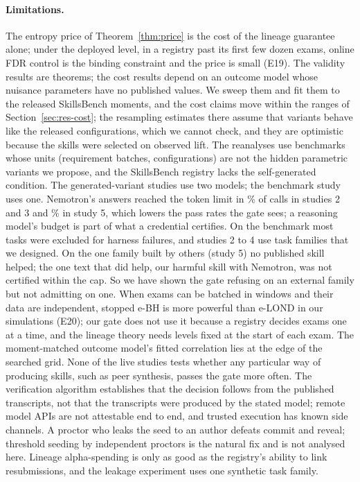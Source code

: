 \paragraph{Limitations.} The entropy price of Theorem~\ref{thm:price} is the cost of the lineage guarantee alone; under the deployed level, in a registry past its first few dozen exams, online FDR control is the binding constraint and the price is small (E19). The validity results are theorems; the cost results depend on an outcome model whose nuisance parameters have no published values. We sweep them and fit them to the released SkillsBench moments, and the cost claims move within the ranges of Section~\ref{sec:res-cost}; the resampling estimates there assume that variants behave like the released configurations, which we cannot check, and they are optimistic because the skills were selected on observed lift. The reanalyses use benchmarks whose units (requirement batches, configurations) are not the hidden parametric variants we propose, and the SkillsBench registry lacks the self-generated condition. The generated-variant studies use two models; the benchmark study uses one. Nemotron's answers reached the token limit in \NLnCutPct\% of calls in studies 2 and 3 and \NLnFiveCutPct\% in study 5, which lowers the pass rates the gate sees; a reasoning model's budget is part of what a credential certifies. On the benchmark most tasks were excluded for harness failures, and studies 2 to 4 use task families that we designed. On the one family built by others (study 5) no published skill helped; the one text that did help, our harmful skill with Nemotron, was not certified within the cap. So we have shown the gate refusing on an external family but not admitting on one. When exams can be batched in windows and their data are independent, stopped e-BH \citep{wang2025stopped} is more powerful than e-LOND in our simulations (E20); our gate does not use it because a registry decides exams one at a time, and the lineage theory needs levels fixed at the start of each exam. The moment-matched outcome model's fitted correlation lies at the edge of the searched grid. None of the live studies tests whether any particular way of producing skills, such as peer synthesis, passes the gate more often. The verification algorithm establishes that the decision follows from the published transcripts, not that the transcripts were produced by the stated model; remote model APIs are not attestable end to end, and trusted execution has known side channels. A proctor who leaks the seed to an author defeats commit and reveal; threshold seeding by independent proctors is the natural fix and is not analysed here. Lineage alpha-spending is only as good as the registry's ability to link resubmissions, and the leakage experiment uses one synthetic task family.

